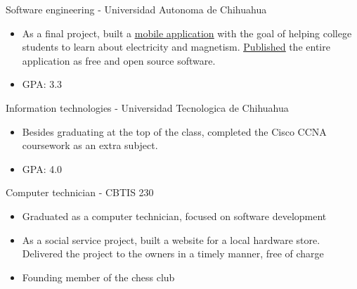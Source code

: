 %
%
%


\begin{scholarship}
        {Software engineering - Universidad Autonoma de Chihuahua}
        {
            \begin{itemize}
                \item As a final project, built a \href{https://play.google.com/store/apps/details?id=net.kippel.gilbert}{\underline{mobile application}}
                    with the goal of helping college students to learn about electricity
                    and magnetism. \href{https://github.com/alanverdugo/gilbert}{\underline{Published}}
                    the entire application as free and open source software.
                \item GPA: 3.3
            \end{itemize}
        }
        {Information technologies - Universidad Tecnologica de Chihuahua}
        {
            \begin{itemize}
                \item Besides graduating at the top of the class, completed the Cisco CCNA coursework as an extra subject.
                \item GPA: 4.0
            \end{itemize}
        }
        {Computer technician - CBTIS 230}
        {
            \begin{itemize}
                \item Graduated as a computer technician, focused on software development
                \item As a social service project, built a website for a local hardware store. Delivered the project to the owners in a timely manner, free of charge
                \item Founding member of the chess club
            \end{itemize}
        }
\end{scholarship}